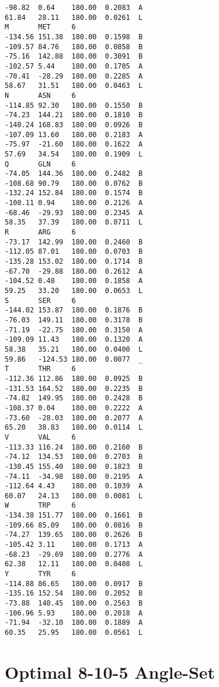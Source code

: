 \begin{small}
\begin{verbatim}
-98.82  0.64    180.00  0.2083  A
61.84   28.11   180.00  0.0261  L
M       MET     6
-134.56 151.38  180.00  0.1598  B
-109.57 84.76   180.00  0.0858  B
-75.16  142.88  180.00  0.3091  B
-102.57 5.44    180.00  0.1705  A
-70.41  -28.29  180.00  0.2285  A
58.67   31.51   180.00  0.0463  L
N       ASN     6
-114.85 92.30   180.00  0.1550  B
-74.23  144.21  180.00  0.1810  B
-140.24 168.83  180.00  0.0926  B
-107.09 13.60   180.00  0.2183  A
-75.97  -21.60  180.00  0.1622  A
57.69   34.54   180.00  0.1909  L
Q       GLN     6
-74.05  144.36  180.00  0.2482  B
-108.68 90.79   180.00  0.0762  B
-132.24 152.84  180.00  0.1574  B
-100.11 0.94    180.00  0.2126  A
-68.46  -29.93  180.00  0.2345  A
58.35   37.39   180.00  0.0711  L
R       ARG     6
-73.17  142.99  180.00  0.2460  B
-112.05 87.01   180.00  0.0703  B
-135.28 153.02  180.00  0.1714  B
-67.70  -29.88  180.00  0.2612  A
-104.52 0.48    180.00  0.1858  A
59.25   33.20   180.00  0.0653  L
S       SER     6
-144.02 153.87  180.00  0.1876  B
-76.03  149.11  180.00  0.3178  B
-71.19  -22.75  180.00  0.3150  A
-109.09 11.43   180.00  0.1320  A
58.38   35.21   180.00  0.0400  L
59.86   -124.53 180.00  0.0077  _
T       THR     6
-112.36 112.86  180.00  0.0925  B
-131.53 164.52  180.00  0.2235  B
-74.82  149.95  180.00  0.2428  B
-108.37 0.04    180.00  0.2222  A
-73.60  -28.03  180.00  0.2077  A
65.20   38.83   180.00  0.0114  L
V       VAL     6
-113.33 116.24  180.00  0.2160  B
-74.12  134.53  180.00  0.2703  B
-130.45 155.40  180.00  0.1823  B
-74.11  -34.98  180.00  0.2195  A
-112.64 4.43    180.00  0.1039  A
60.07   24.13   180.00  0.0081  L
W       TRP     6
-134.38 151.77  180.00  0.1661  B
-109.66 85.09   180.00  0.0816  B
-74.27  139.65  180.00  0.2626  B
-105.42 3.11    180.00  0.1713  A
-68.23  -29.69  180.00  0.2776  A
62.38   12.11   180.00  0.0408  L
Y       TYR     6
-114.88 86.65   180.00  0.0917  B
-135.16 152.54  180.00  0.2052  B
-73.88  140.45  180.00  0.2563  B
-106.96 5.93    180.00  0.2018  A
-71.94  -32.10  180.00  0.1889  A
60.35   25.95   180.00  0.0561  L
\end{verbatim}
\end{small}

\section{Optimal 8-10-5 Angle-Set}
\label{appendix:angleset:AngleSet8105}

